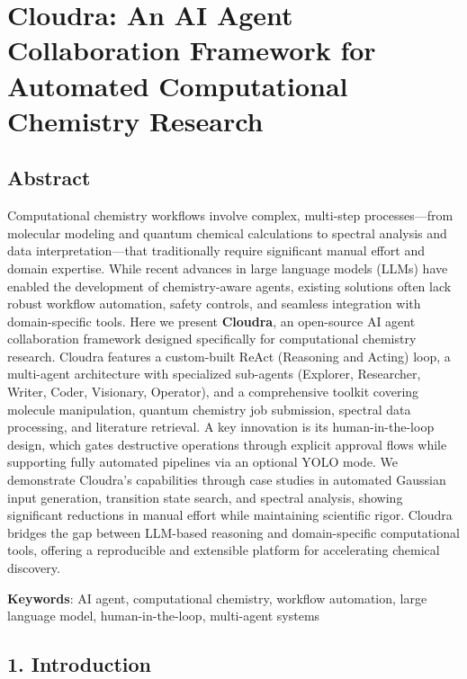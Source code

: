 \hypertarget{cloudra-an-ai-agent-collaboration-framework-for-automated-computational-chemistry-research}{%
\section{Cloudra: An AI Agent Collaboration Framework for Automated
Computational Chemistry
Research}\label{cloudra-an-ai-agent-collaboration-framework-for-automated-computational-chemistry-research}}

\hypertarget{abstract}{%
\subsection{Abstract}\label{abstract}}

Computational chemistry workflows involve complex, multi-step
processes---from molecular modeling and quantum chemical calculations to
spectral analysis and data interpretation---that traditionally require
significant manual effort and domain expertise. While recent advances in
large language models (LLMs) have enabled the development of
chemistry-aware agents, existing solutions often lack robust workflow
automation, safety controls, and seamless integration with
domain-specific tools. Here we present \textbf{Cloudra}, an open-source
AI agent collaboration framework designed specifically for computational
chemistry research. Cloudra features a custom-built ReAct (Reasoning and
Acting) loop, a multi-agent architecture with specialized sub-agents
(Explorer, Researcher, Writer, Coder, Visionary, Operator), and a
comprehensive toolkit covering molecule manipulation, quantum chemistry
job submission, spectral data processing, and literature retrieval. A
key innovation is its human-in-the-loop design, which gates destructive
operations through explicit approval flows while supporting fully
automated pipelines via an optional YOLO mode. We demonstrate Cloudra's
capabilities through case studies in automated Gaussian input
generation, transition state search, and spectral analysis, showing
significant reductions in manual effort while maintaining scientific
rigor. Cloudra bridges the gap between LLM-based reasoning and
domain-specific computational tools, offering a reproducible and
extensible platform for accelerating chemical discovery.

\textbf{Keywords}: AI agent, computational chemistry, workflow
automation, large language model, human-in-the-loop, multi-agent systems

\hypertarget{introduction}{%
\subsection{1. Introduction}\label{introduction}}

